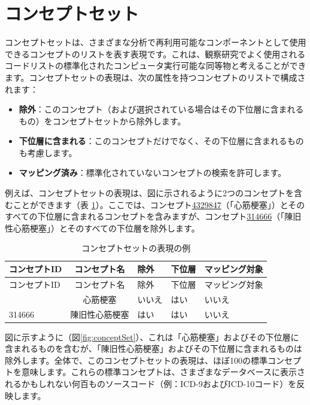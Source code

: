 \documentclass[
  11pt]{book}
\providecommand{\tightlist}{%
  \setlength{\itemsep}{0pt}\setlength{\parskip}{0pt}}
\theoremstyle{definition}
\theoremstyle{definition}
\theoremstyle{definition}
\theoremstyle{definition}
\theoremstyle{remark}
\begin{document}
\section{コンセプトセット}\label{conceptSets}


コンセプトセットは、さまざまな分析で再利用可能なコンポーネントとして使用できるコンセプトのリストを表す表現です。これは、観察研究でよく使用されるコードリストの標準化されたコンピュータ実行可能な同等物と考えることができます。コンセプトセットの表現は、次の属性を持つコンセプトのリストで構成されます：

\begin{itemize}
\tightlist
\item
  \textbf{除外}：このコンセプト（および選択されている場合はその下位層に含まれるもの）をコンセプトセットから除外します。
\item
  \textbf{下位層に含まれる}：このコンセプトだけでなく、その下位層に含まれるものも考慮します。
\item
  \textbf{マッピング済み}：標準化されていないコンセプトの検索を許可します。
\end{itemize}

例えば、コンセプトセットの表現は、図に示されるように2つのコンセプトを含むことができます（表 \ref{tab:conceptSetExpression}）。ここでは、コンセプト\href{http://athena.ohdsi.org/search-terms/terms/4329847}{4329847}（「心筋梗塞」）とそのすべての下位層に含まれるコンセプトを含みますが、コンセプト\href{http://athena.ohdsi.org/search-terms/terms/314666}{314666}（「陳旧性心筋梗塞」）とそのすべての下位層を除外します。

\begin{longtable}[]{@{}lclll@{}}
\caption{\label{tab:conceptSetExpression} コンセプトセットの表現の例}\tabularnewline
\toprule\noalign{}
コンセプトID & コンセプト名 & 除外 & 下位層 & マッピング対象 \\
\midrule\noalign{}
\endfirsthead
\toprule\noalign{}
コンセプトID & コンセプト名 & 除外 & 下位層 & マッピング対象 \\
\midrule\noalign{}
\endhead
\bottomrule\noalign{}
\endlastfoot
4329847 & 心筋梗塞 & いいえ & はい & いいえ \\
314666 & 陳旧性心筋梗塞 & はい & はい & いいえ \\
\end{longtable}

図に示すように（図\ref{fig:conceptSet}）、これは「心筋梗塞」およびその下位層に含まれるものを含むが、「陳旧性心筋梗塞」およびその下位層に含まれるものは除外します。全体で、このコンセプトセットの表現は、ほぼ100の標準コンセプトを意味します。これらの標準コンセプトは、さまざまなデータベースに表示されるかもしれない何百ものソースコード（例：ICD-9およびICD-10コード）を反映します。
\end{document}
